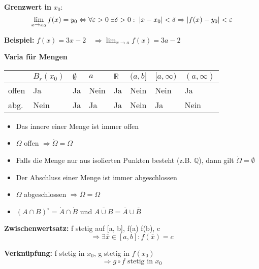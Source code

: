 \begin{itemize}
\textbf{Grenzwert in } $x_0$:  
\[
\lim_{x \to x_0} f(x) = y_0 \Leftrightarrow
\forall \varepsilon > 0\; \exists \delta > 0: \\
\; |x - x_0| < \delta \Rightarrow |f(x) - y_0| < \varepsilon
\]

\textbf{Beispiel:}  
$f(x) = 3x - 2 \quad \Rightarrow \lim_{x \to a} f(x) = 3a - 2$

\textbf{Varia für Mengen}
\renewcommand{\arraystretch}{1.2}

\begin{center}
\begin{tabularx}{\linewidth}{l 
  >{\centering\arraybackslash}p{0.5cm} 
  >{\centering\arraybackslash}p{0.1cm} 
  >{\centering\arraybackslash}p{0.2cm} 
  >{\centering\arraybackslash}p{0.2cm} 
  >{\centering\arraybackslash}p{0.3cm} 
  >{\centering\arraybackslash}p{0.3cm} 
  >{\centering\arraybackslash}p{0.3cm}}
\toprule
& $B_r(x_0)$ & $\emptyset$ & $a$ & $\mathbb{R}$ & $(a,b]$ & $[a,\infty)$ & $(a,\infty)$ \\
\midrule
offen     & Ja   & Ja  & Nein & Ja  & Nein & Nein & Ja \\
abg. & Nein & Ja  & Ja   & Ja  & Nein & Ja   & Nein \\
\bottomrule
\end{tabularx}
\end{center}
\begin{itemize}[leftmargin=1.5em]
  \item Das innere einer Menge ist immer offen
  \item $\Omega$ offen $\Rightarrow \mathring{\Omega} = \Omega$
  \item Falls die Menge nur aus isolierten Punkten besteht (z.B. $\mathbb{Q}$), dann gilt $\mathring{\Omega} = \emptyset$
  \item Der Abschluss einer Menge ist immer abgeschlossen
  \item $\Omega$ abgeschlossen $\Rightarrow \overline{\Omega} = \Omega$
  \item $(A \cap B)^\circ = \mathring{A} \cap \mathring{B}$ \quad und \quad $\overline{A \cup B} = \overline{A} \cup \overline{B}$
\end{itemize}

\textbf{Zwischenwertsatz:}  
f stetig auf [a, b],\; f(a) \leq f(b),\; c \in [f(a), f(b)]  
\[
\Rightarrow \exists \bar{x} \in [a, b]: f(\bar{x}) = c
\]

\textbf{Verknüpfung:}  
f stetig in \( x_0 \),\; g stetig in \( f(x_0) \)  
\[
\Rightarrow g \circ f \text{ stetig in } x_0
\]


\end{itemize}
